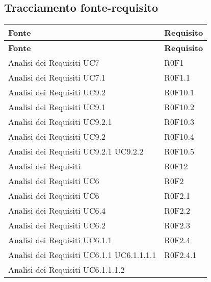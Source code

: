 \documentclass[../AnalisiDeiRequisiti.tex]{subfiles}
\begin{document}
	\subsection{Tracciamento fonte-requisito}
	\def\arraystretch{1.5}
	\begin{longtable}{p{5cm}!{\VRule[1pt]}p{5cm}}
		\color{white} \textbf{Fonte} & \color{white} \textbf{Requisito} \\ 
		\endfirsthead 
		\color{white} \textbf{Fonte} & \color{white} \textbf{Requisito} \\ 
		\endhead 
		Analisi dei Requisiti \newline UC7
		& R0F1 \\
		Analisi dei Requisiti \newline UC7.1
		& R0F1.1 \\
		Analisi dei Requisiti \newline UC9.2
		& R0F10.1 \\
		Analisi dei Requisiti \newline UC9.1
		& R0F10.2 \\
		Analisi dei Requisiti \newline UC9.2.1
		& R0F10.3 \\
		Analisi dei Requisiti \newline UC9.2
		& R0F10.4 \\
		Analisi dei Requisiti \newline UC9.2.1
		\newline UC9.2.2
		& R0F10.5 \\
		Analisi dei Requisiti & R0F12 \\
		Analisi dei Requisiti \newline UC6
		& R0F2 \\
		Analisi dei Requisiti \newline UC6
		& R0F2.1 \\
		Analisi dei Requisiti \newline UC6.4
		& R0F2.2 \\
		Analisi dei Requisiti \newline UC6.2
		& R0F2.3 \\
		Analisi dei Requisiti \newline UC6.1.1
		& R0F2.4 \\
		Analisi dei Requisiti \newline UC6.1.1
		\newline UC6.1.1.1.1
		& R0F2.4.1 \\
		Analisi dei Requisiti \newline UC6.1.1.1.2

\end{longtable}
\end{document}
